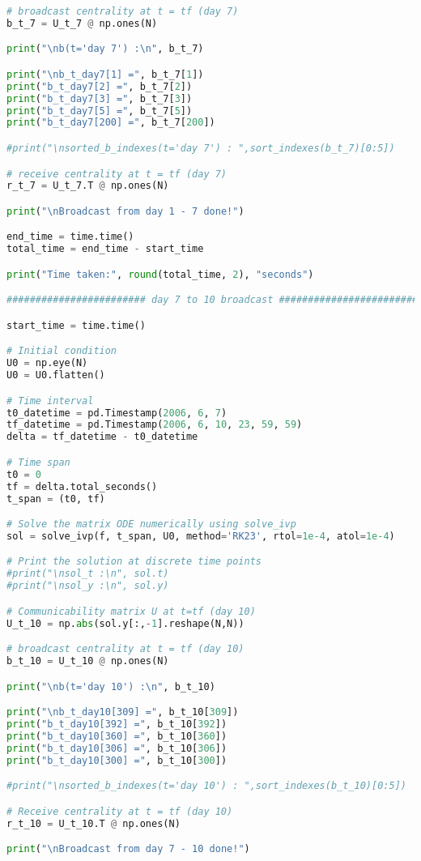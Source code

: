 \begin{lstlisting}[language=Python, caption=Second synthetic experiment]
# broadcast centrality at t = tf (day 7)
b_t_7 = U_t_7 @ np.ones(N)

print("\nb(t='day 7') :\n", b_t_7)

print("\nb_t_day7[1] =", b_t_7[1])
print("b_t_day7[2] =", b_t_7[2])
print("b_t_day7[3] =", b_t_7[3])
print("b_t_day7[5] =", b_t_7[5])
print("b_t_day7[200] =", b_t_7[200])

#print("\nsorted_b_indexes(t='day 7') : ",sort_indexes(b_t_7)[0:5])

# receive centrality at t = tf (day 7)
r_t_7 = U_t_7.T @ np.ones(N)

print("\nBroadcast from day 1 - 7 done!")

end_time = time.time()
total_time = end_time - start_time

print("Time taken:", round(total_time, 2), "seconds")

######################## day 7 to 10 broadcast #########################

start_time = time.time()

# Initial condition 
U0 = np.eye(N)
U0 = U0.flatten()

# Time interval
t0_datetime = pd.Timestamp(2006, 6, 7)
tf_datetime = pd.Timestamp(2006, 6, 10, 23, 59, 59)
delta = tf_datetime - t0_datetime 

# Time span
t0 = 0
tf = delta.total_seconds()
t_span = (t0, tf) 

# Solve the matrix ODE numerically using solve_ivp
sol = solve_ivp(f, t_span, U0, method='RK23', rtol=1e-4, atol=1e-4)

# Print the solution at discrete time points
#print("\nsol_t :\n", sol.t)
#print("\nsol_y :\n", sol.y)

# Communicability matrix U at t=tf (day 10)
U_t_10 = np.abs(sol.y[:,-1].reshape(N,N))

# broadcast centrality at t = tf (day 10)
b_t_10 = U_t_10 @ np.ones(N)

print("\nb(t='day 10') :\n", b_t_10)

print("\nb_t_day10[309] =", b_t_10[309])
print("b_t_day10[392] =", b_t_10[392])
print("b_t_day10[360] =", b_t_10[360])
print("b_t_day10[306] =", b_t_10[306])
print("b_t_day10[300] =", b_t_10[300])

#print("\nsorted_b_indexes(t='day 10') : ",sort_indexes(b_t_10)[0:5])

# Receive centrality at t = tf (day 10)
r_t_10 = U_t_10.T @ np.ones(N)

print("\nBroadcast from day 7 - 10 done!")


\end{lstlisting}
